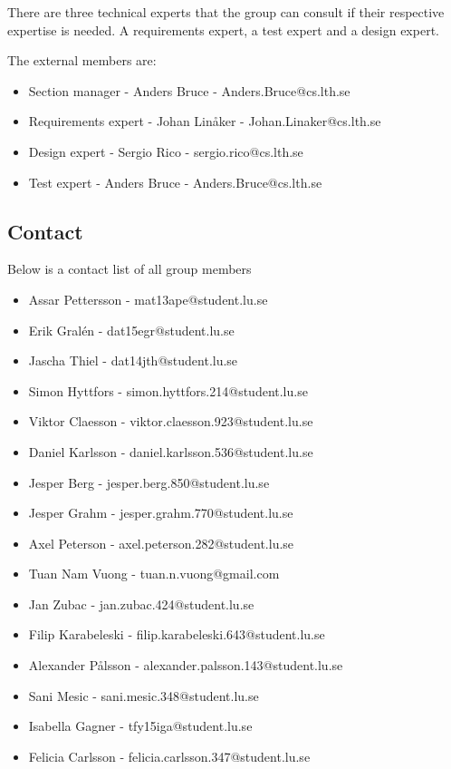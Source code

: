 \documentclass{article}
\begin{document}
There are three technical experts that the group can consult if their respective expertise is needed. A requirements expert, a test expert and a design expert.

The external members are:
\begin{itemize}  
\item Section manager - Anders Bruce - Anders.Bruce@cs.lth.se
\item Requirements expert - Johan Linåker - Johan.Linaker@cs.lth.se
\item Design expert - Sergio Rico - sergio.rico@cs.lth.se
\item Test expert - Anders Bruce - Anders.Bruce@cs.lth.se
\end{itemize}

\subsection{Contact}
Below is a contact list of all group members
\begin{itemize}  
\item Assar Pettersson - mat13ape@student.lu.se
\item Erik Gralén - dat15egr@student.lu.se
\item Jascha Thiel - dat14jth@student.lu.se
\item Simon Hyttfors - simon.hyttfors.214@student.lu.se
\item Viktor Claesson - viktor.claesson.923@student.lu.se
\item Daniel Karlsson - daniel.karlsson.536@student.lu.se
\item Jesper Berg - jesper.berg.850@student.lu.se
\item Jesper Grahm - jesper.grahm.770@student.lu.se
\item Axel Peterson - axel.peterson.282@student.lu.se
\item Tuan Nam Vuong - tuan.n.vuong@gmail.com
\item Jan Zubac - jan.zubac.424@student.lu.se
\item Filip Karabeleski - filip.karabeleski.643@student.lu.se
\item Alexander Pålsson - alexander.palsson.143@student.lu.se
\item Sani Mesic - sani.mesic.348@student.lu.se
\item Isabella Gagner - tfy15iga@student.lu.se
\item Felicia Carlsson - felicia.carlsson.347@student.lu.se
\end{itemize}
\end{document}
